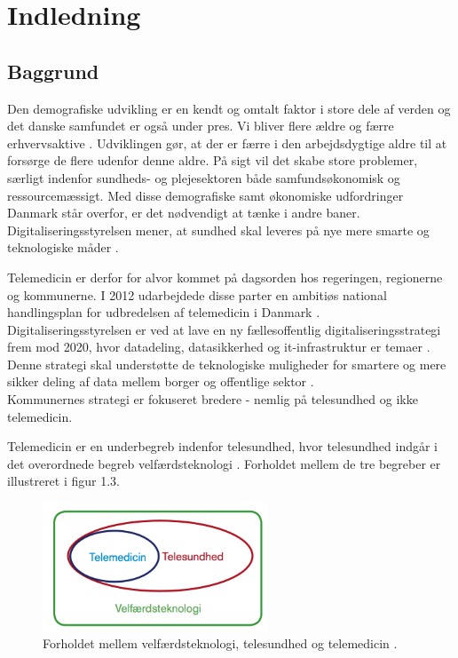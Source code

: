 \chapter{Indledning}

\section{Baggrund}
Den demografiske udvikling er en kendt og omtalt faktor i store dele af verden og  det danske samfundet er også under pres. Vi bliver flere ældre og færre erhvervsaktive \parencite{KL}. Udviklingen gør, at der er færre i den arbejdsdygtige aldre til at forsørge de flere udenfor denne aldre. På sigt vil det skabe store problemer, særligt indenfor sundheds- og plejesektoren både samfundsøkonomisk og ressourcemæssigt. Med disse demografiske samt økonomiske udfordringer Danmark står overfor, er det nødvendigt at tænke i andre baner. Digitaliseringsstyrelsen mener, at sundhed skal leveres på nye mere smarte og teknologiske måder \parencite{Digst}.    

Telemedicin er derfor for alvor kommet på dagsorden hos regeringen, regionerne og kommunerne. I 2012 udarbejdede disse parter en ambitiøs national handlingsplan for udbredelsen af telemedicin i Danmark \parencite{Digst} \parencite{NationalH}.\\
Digitaliseringsstyrelsen er ved at lave en ny fællesoffentlig digitaliseringsstrategi frem mod 2020, hvor datadeling, datasikkerhed og it-infrastruktur er temaer \parencite{digst1}. Denne strategi skal understøtte de teknologiske muligheder for smartere og mere sikker deling af data mellem borger og offentlige sektor \parencite{digst2}.\\
Kommunernes strategi er fokuseret bredere - nemlig på telesundhed og ikke telemedicin.

Telemedicin er en underbegreb indenfor telesundhed, hvor telesundhed indgår i det overordnede begreb velfærdsteknologi \parencite{KLs}. Forholdet mellem de tre begreber er illustreret i figur 1.3. 

\begin{figure}[H]
	\centering
		\caption{Forholdet mellem velfærdsteknologi, telesundhed og telemedicin \parencite{KLs}.}
	\includegraphics[width=0.6\textwidth]{Figurer/Snip20160426_6}
\end{figure}

